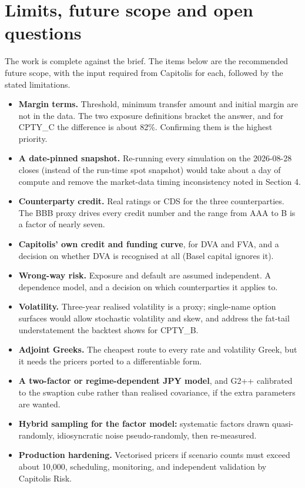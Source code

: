 \documentclass[11pt,letterpaper]{article}
\begin{document}
\section{Limits, future scope and open questions}

The work is complete against the brief. The items below are the recommended future scope, with the input required from Capitolis for each, followed by the stated limitations.

\begin{itemize}
\item \textbf{Margin terms.} Threshold, minimum transfer amount and initial margin are not in the data. The two exposure definitions bracket the answer, and for CPTY\_C the difference is about 82\%. Confirming them is the highest priority.
\item \textbf{A date-pinned snapshot.} Re-running every simulation on the 2026-08-28 closes (instead of the run-time spot snapshot) would take about a day of compute and remove the market-data timing inconsistency noted in Section 4.
\item \textbf{Counterparty credit.} Real ratings or CDS for the three counterparties. The BBB proxy drives every credit number and the range from AAA to B is a factor of nearly seven.
\item \textbf{Capitolis' own credit and funding curve}, for DVA and FVA, and a decision on whether DVA is recognised at all (Basel capital ignores it).
\item \textbf{Wrong-way risk.} Exposure and default are assumed independent. A dependence model, and a decision on which counterparties it applies to.
\item \textbf{Volatility.} Three-year realised volatility is a proxy; single-name option surfaces would allow stochastic volatility and skew, and address the fat-tail understatement the backtest shows for CPTY\_B.
\item \textbf{Adjoint Greeks.} The cheapest route to every rate and volatility Greek, but it needs the pricers ported to a differentiable form.
\item \textbf{A two-factor or regime-dependent JPY model}, and G2++ calibrated to the swaption cube rather than realised covariance, if the extra parameters are wanted.
\item \textbf{Hybrid sampling for the factor model:} systematic factors drawn quasi-randomly, idiosyncratic noise pseudo-randomly, then re-measured.
\item \textbf{Production hardening.} Vectorised pricers if scenario counts must exceed about 10,000, scheduling, monitoring, and independent validation by Capitolis Risk.
\end{itemize}
\end{document}
